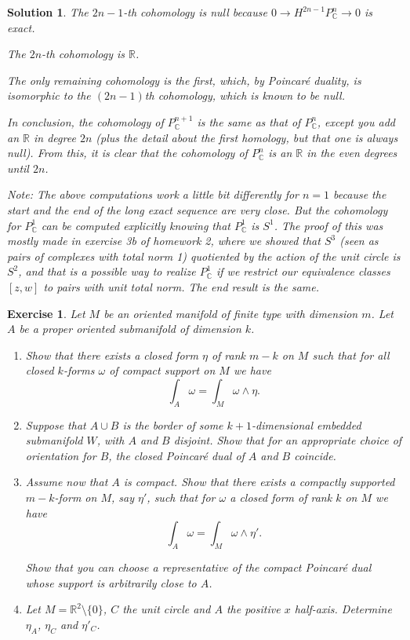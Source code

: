 \documentclass{article}
\newtheorem{ex}{Exercise}
\theoremstyle{nonumberplain}
\newtheorem{sol}{Solution}
\newcommand{\R}{\mathbb{R}}
\newcommand{\C}{\mathbb{C}}
\begin{document}
\begin{sol}
The $2n-1$-th cohomology is null because $0 \rightarrow H^{2n-1} P^n_\C \rightarrow 0$ is exact.

The $2n$-th cohomology is $\R$.

The only remaining cohomology is the first, which, by Poincaré duality, is isomorphic to the $(2n-1)$th cohomology, which is known to be null.

In conclusion, the cohomology of $P^{n+1}_\C$ is the same as that of $P^n_\C$, except you add an $\R$ in degree $2n$ (plus the detail about the first homology, but that one is always null). From this, it is clear that the cohomology of $P^n_\C$ is an $\R$ in the even degrees until $2n$.

Note: The above computations work a little bit differently for $n=1$ because the start and the end of the long exact sequence are very close. But the cohomology for $P^1_\C$ can be computed explicitly knowing that $P^1_\C$ is $S^1$. The proof of this was mostly made in exercise 3b of homework 2, where we showed that $S^3$ (seen as pairs of complexes with total norm 1) quotiented by the action of the unit circle is $S^2$, and that is a possible way to realize $P^1_\C$ if we restrict our equivalence classes $[z,w]$ to pairs with unit total norm. The end result is the same.
\end{sol}

\begin{ex}
Let $M$ be an oriented manifold of finite type with dimension $m$. Let $A$ be a proper oriented submanifold of dimension $k$.
\begin{enumerate}
\item Show that there exists a closed form $\eta$ of rank $m-k$ on $M$ such that for all closed $k$-forms $\omega$ of compact support on $M$ we have
\[\int_A \omega = \int_M \omega \wedge \eta.\]

\item Suppose that $A \cup B$ is the border of some $k+1$-dimensional embedded submanifold $W$, with $A$ and $B$ disjoint. Show that for an appropriate choice of orientation for $B$, the closed Poincaré dual of $A$ and $B$ coincide.

\item Assume now that $A$ is compact. Show that there exists a compactly supported $m-k$-form on $M$, say $\eta'$, such that for $\omega$ a closed form of rank $k$ on $M$ we have
\[\int_A \omega = \int_M \omega \wedge \eta'.\]

Show that you can choose a representative of the compact Poincaré dual whose support is arbitrarily close to $A$.

\item Let $M = \R^2 \setminus \{0\}$, $C$ the unit circle and $A$ the positive $x$ half-axis. Determine $\eta_A$, $\eta_C$ and $\eta'_C$.
\end{enumerate}
\end{ex}
\end{document}
